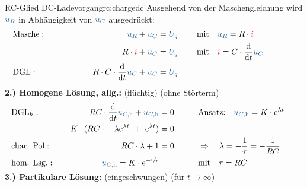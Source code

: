 {\begin{bsp}{RC-Glied DC-Ladevorgang}{rc:chargedc}
        Ausgehend von der Maschengleichung wird $\ecv{u_R}$ in Abhängigkeit von $\ecv{u_C}$ ausgedrückt:%
        \begingroup%
            \addtolength{\jot}{2pt}%
        \begin{align*}
            &\text{Masche}:&&&
                \ecv{u_R} + \ecv{u_C}  &= \ecv{U_q}&&&
                &\text{mit}\quad \ecv{u_R} = R \cdot \eci{i} \\
            &&&&
                R \cdot {\color{red} i} + \ecv{u_C}    &= \ecv{U_q}&&&
                &\text{mit}\quad \eci{i} = C \cdot \frac{\mathrm{d}}{\mathrm{d}t} \ecv{u_C} \\
            &\text{DGL}:&&&
                R \cdot C \cdot \frac{\mathrm{d}}{\mathrm{d}t} \ecv{u_C}  + \ecv{u_C}   &= \ecv{U_q}
                \\[-15pt]&\hphantom{R1ooooooo}&&&\hphantom{L3oooooooooooooooooooo}&\hphantom{R3ooo}&&&&\hphantom{R5oooooooooooooooooooooo}\nonumber%
            \end{align*}%
        \textbf{2.) Homogene Lösung, allg.:} (flüchtig) (ohne Störterm)%
        \begin{align*}%
            &\text{DGL}_{h}:&&&
                RC \cdot \frac{\mathrm{d}}{\mathrm{d}t} \ecv{u_{C,\mathrm{h}}} + \ecv{u_{C,\mathrm{h}}} &= 0 &&&
                    &\text{Ansatz:}\quad
                    \ecv{u_{C,\mathrm{h}}} = K \cdot \mathrm{e}^{\lambda t}\\
            &&&&
                K \cdot(RC \cdot \quad\lambda \mathrm{e}^{\lambda t}\ +\ \mathrm{e}^{\lambda t}) &= 0 \\
            &\text{char. Pol.:}&&&
                RC \cdot \lambda + 1 &= 0 &&&
                    &\Rightarrow\quad \lambda = -\frac{1}{\tau} = -\frac{1}{RC}\\
            &\text{hom. Lsg.}:&&&
                \ecv{u_{C,\mathrm{h}}} = K \cdot \mathrm{e}^{-\sfrac{t}{\tau}}&&&&
                    &\text{mit}\quad \tau = RC
        \\[-15pt]&\hphantom{R1ooooooo}&&&\hphantom{L3oooooooooooooooooooo}&\hphantom{R3ooo}&&&&\hphantom{R5oooooooooooooooooooooo}\nonumber%
        \end{align*}%
        \textbf{3.) Partikulare Lösung:} (eingeschwungen) (für $t \to \infty$)%
        \begin{align*}%

\end{align*}
\end{bsp}}
